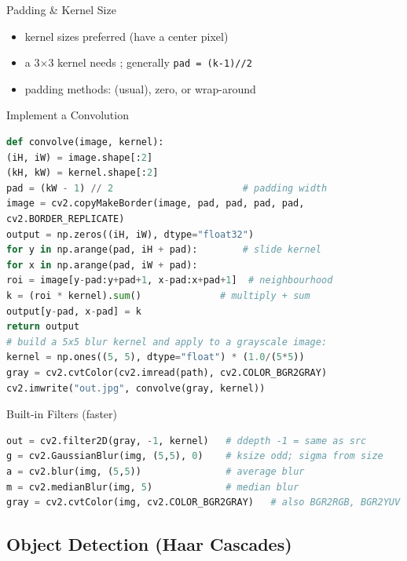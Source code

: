 \begin{definition}{Padding \& Kernel Size}
    \begin{itemize}
        \item {} kernel sizes preferred (have a center pixel)
        \item a 3$\times$3 kernel needs ; generally
              \texttt{pad = (k-1)//2}
        \item padding methods:  (usual), zero, or wrap-around
    \end{itemize}
\end{definition}

\multend

\begin{KR}{Implement a Convolution}
\begin{lstlisting}[language=Python, style=basesmol, aboveskip=2pt, belowskip=2pt]
def convolve(image, kernel):
(iH, iW) = image.shape[:2]
(kH, kW) = kernel.shape[:2]
pad = (kW - 1) // 2                       # padding width
image = cv2.copyMakeBorder(image, pad, pad, pad, pad,
cv2.BORDER_REPLICATE)
output = np.zeros((iH, iW), dtype="float32")
for y in np.arange(pad, iH + pad):        # slide kernel
for x in np.arange(pad, iW + pad):
roi = image[y-pad:y+pad+1, x-pad:x+pad+1]  # neighbourhood
k = (roi * kernel).sum()              # multiply + sum
output[y-pad, x-pad] = k
return output
# build a 5x5 blur kernel and apply to a grayscale image:
kernel = np.ones((5, 5), dtype="float") * (1.0/(5*5))
gray = cv2.cvtColor(cv2.imread(path), cv2.COLOR_BGR2GRAY)
cv2.imwrite("out.jpg", convolve(gray, kernel))
\end{lstlisting}
\end{KR}

\begin{KR}{Built-in Filters (faster)}
\begin{lstlisting}[language=Python, style=basesmol, aboveskip=2pt, belowskip=2pt]
out = cv2.filter2D(gray, -1, kernel)   # ddepth -1 = same as src
g = cv2.GaussianBlur(img, (5,5), 0)    # ksize odd; sigma from size
a = cv2.blur(img, (5,5))               # average blur
m = cv2.medianBlur(img, 5)             # median blur
gray = cv2.cvtColor(img, cv2.COLOR_BGR2GRAY)   # also BGR2RGB, BGR2YUV
\end{lstlisting}
\end{KR}

\subsection{Object Detection (Haar Cascades)}

